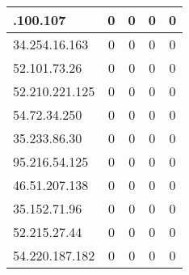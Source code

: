\documentclass{article}
\begin{document}
\begin{longtable}{|>{\raggedright\arraybackslash}p{3cm}|c|c|c|c|}
    54.170.100.107 & 0 & 0 & 0 & 0 \\
    \hline
    
    
    \rowcolor{lightgreen} %
    
    34.254.16.163 & 0 & 0 & 0 & 0 \\
    \hline
    
    
    \rowcolor{lightgreen} %
    
    52.101.73.26 & 0 & 0 & 0 & 0 \\
    \hline
    
    
    \rowcolor{lightgreen} %
    
    52.210.221.125 & 0 & 0 & 0 & 0 \\
    \hline
    
    
    \rowcolor{lightgreen} %
    
    54.72.34.250 & 0 & 0 & 0 & 0 \\
    \hline
    
    
    \rowcolor{lightgreen} %
    
    35.233.86.30 & 0 & 0 & 0 & 0 \\
    \hline
    
    
    \rowcolor{lightgreen} %
    
    95.216.54.125 & 0 & 0 & 0 & 0 \\
    \hline
    
    
    \rowcolor{lightgreen} %
    
    46.51.207.138 & 0 & 0 & 0 & 0 \\
    \hline
    
    
    \rowcolor{lightgreen} %
    
    35.152.71.96 & 0 & 0 & 0 & 0 \\
    \hline
    
    
    \rowcolor{lightgreen} %
    
    52.215.27.44 & 0 & 0 & 0 & 0 \\
    \hline
    
    
    \rowcolor{lightgreen} %
    
    54.220.187.182 & 0 & 0 & 0 & 0 \\
    \hline
    

\end{longtable}
\end{document}
